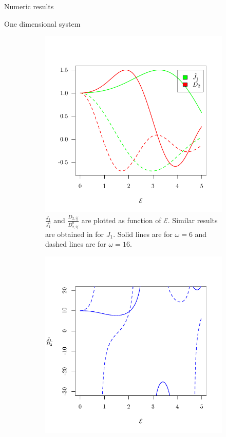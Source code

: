 \begin{section}{Numeric results}
\begin{subsection}{One dimensional system}
\begin{figure}
\centering
\begin{subfigure}{.45\textwidth}
  \includegraphics[width=1\linewidth]{Figures/NNvsNNN.pdf}
  \caption{$\frac{J_{1}}{J_{1}^0}$ and $\frac{D_{2,ij}}{D_{2,ij}^0}$ are plotted as function of $\mathcal{E}$. Similar results are obtained in \cite{Mentink2015} for $J_{1}$. Solid lines are for $\omega = 6$ and dashed lines are for $\omega = 16$.}
  \label{Fig3.1:NNvsNNN}
\end{subfigure}%
\hspace*{\fill}
\begin{subfigure}{.45\textwidth}
  \includegraphics[width=1\linewidth]{Figures/ratio.pdf}

\end{subfigure}
\end{figure}
\end{subsection}
\end{section}
